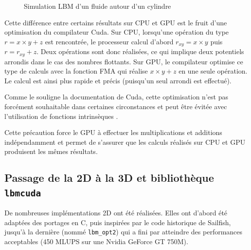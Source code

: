 \begin{figure}[h]
{		\label{fig:lbm_42000}
	}
	\caption{Simulation \ac{LBM} d'un fluide autour d'un cylindre}
	\label{fig:lbm_5000_to_43000}
\end{figure}

Cette différence entre certains résultats sur \ac{CPU} et \ac{GPU} est le fruit d'une optimisation du compilateur Cuda. Sur \ac{CPU}, lorsqu'une opération du type $r = x \times y+z$ est rencontrée, le processeur calcul d'abord $r_{xy} = x \times y$ puis $r = r_{xy} + z$. Deux opérations sont donc réalisées, ce qui implique deux potentiels arrondis dans le cas des nombres flottants. Sur \ac{GPU}, le compilateur optimise ce type de calculs \cite{noauthor_cuda_nodate-1} avec la fonction \ac{FMA} qui réalise $x \times y+z$ en une seule opération. Le calcul est ainsi plus rapide et précis (puisqu'un seul arrondi est effectué).

Comme le souligne la documentation de Cuda, cette optimisation n'est pas forcément souhaitable dans certaines circonstances et peut être évitée avec l'utilisation de fonctions intrinsèques \cite{noauthor_cuda_nodate-1, noauthor_cuda_nodate-2}.

Cette précaution force le \ac{GPU} à effectuer les multiplications et additions indépendamment et permet de s’assurer que les calculs réalisés sur \ac{CPU} et \ac{GPU} produisent les mêmes résultats.

\subsection{Passage de la 2D à la 3D et bibliothèque \texttt{lbmcuda}}
De nombreuses implémentations 2D ont été réalisées. Elles ont d’abord été adaptées des portages en C, puis inspirées par le code historique de Sailfish, jusqu’à la dernière (nommé \texttt{lbm\_opt2}) qui a fini par atteindre des performances acceptables (450 MLUPS sur une Nvidia GeForce GT 750M). 

